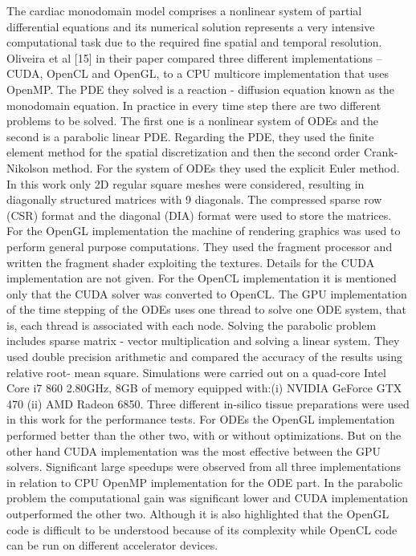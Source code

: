 The cardiac monodomain model comprises a nonlinear system of partial differential equations and its numerical solution represents a very intensive computational task due to the required fine spatial and temporal resolution. Oliveira et al [15] in their paper compared three different implementations – CUDA, OpenCL and OpenGL, to a CPU multicore implementation that uses OpenMP. The PDE they solved is a reaction - diffusion equation known as the monodomain equation. In practice in every time step there are two different problems to be solved. The first one is a nonlinear system of ODEs and the second is a parabolic linear PDE. Regarding the PDE, they used the finite element method for the spatial discretization and then the second order Crank-Nikolson method. For the system of ODEs they used the explicit Euler method. In this work only 2D regular square meshes were considered, resulting in diagonally structured matrices with 9 diagonals. The compressed sparse row (CSR) format and the diagonal (DIA) format were used to store the matrices. For the OpenGL implementation the machine of rendering graphics was used to perform general purpose computations. They used the fragment processor and written the fragment shader exploiting the textures. Details for the CUDA implementation are not given. For the OpenCL implementation it is mentioned only that the CUDA solver was converted to OpenCL. The GPU implementation of the time stepping of the ODEs uses one thread to solve one ODE system, that is, each thread is associated with each node. Solving the parabolic problem includes sparse matrix - vector multiplication and solving a linear system. They used double precision arithmetic and compared the accuracy of the results using relative root- mean square. Simulations were carried out on a quad-core Intel Core i7 860 2.80GHz, 8GB of memory equipped with:(i) NVIDIA GeForce GTX 470 (ii) AMD Radeon 6850. Three different in-silico tissue preparations were used in this work for the performance tests. For ODEs the OpenGL implementation performed better than the other two, with or without optimizations. But on the other hand CUDA implementation was the most effective between the GPU solvers. Significant large speedups were observed from all three implementations in relation to CPU OpenMP implementation for the ODE part. In the parabolic problem the computational gain was significant lower and CUDA implementation outperformed the other two. Although it is also highlighted that the OpenGL code is difficult to be understood because of its complexity while OpenCL code can be run on different accelerator devices.

